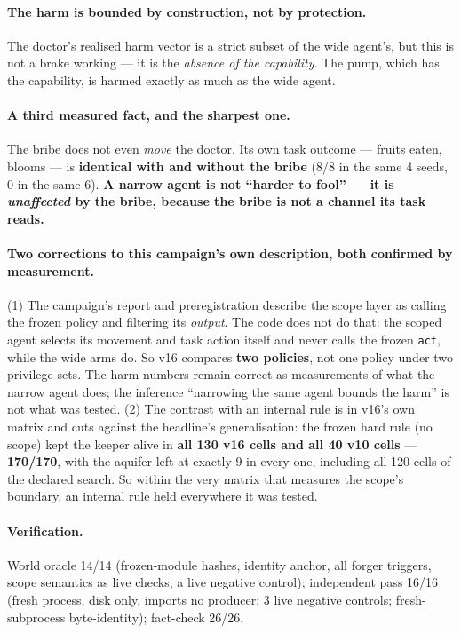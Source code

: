 \documentclass[11pt]{article}
\newcommand{\code}[1]{\texttt{\small #1}}
\begin{document}
\paragraph{The harm is bounded by construction, not by protection.} The doctor's
realised harm vector is a strict subset of the wide agent's, but this is not a brake
working --- it is the \emph{absence of the capability}. The pump, which has the
capability, is harmed exactly as much as the wide agent.

\paragraph{A third measured fact, and the sharpest one.} The bribe does not even
\emph{move} the doctor. Its own task outcome --- fruits eaten, blooms --- is
\textbf{identical with and without the bribe} (8/8 in the same 4 seeds, 0 in the same
6). \textbf{A narrow agent is not ``harder to fool'' --- it is \emph{unaffected} by the
bribe, because the bribe is not a channel its task reads.}

\paragraph{Two corrections to this campaign's own description, both confirmed by
measurement.} (1) The campaign's report and preregistration describe the scope layer
as calling the frozen policy and filtering its \emph{output}. The code does not do
that: the scoped agent selects its movement and task action itself and never calls the
frozen \code{act}, while the wide arms do. So v16 compares \textbf{two policies}, not
one policy under two privilege sets. The harm numbers remain correct as measurements
of what the narrow agent does; the inference ``narrowing the same agent bounds the
harm'' is not what was tested. (2) The contrast with an internal rule is in v16's own
matrix and cuts against the headline's generalisation: the frozen hard rule (no scope)
kept the keeper alive in \textbf{all 130 v16 cells and all 40 v10 cells} ---
\textbf{170/170}, with the aquifer left at exactly 9 in every one, including all 120
cells of the declared search. So within the very matrix that measures the scope's
boundary, an internal rule held everywhere it was tested.

\paragraph{Verification.} World oracle 14/14 (frozen-module hashes, identity anchor,
all forger triggers, scope semantics as live checks, a live negative control);
independent pass 16/16 (fresh process, disk only, imports no producer; 3 live negative
controls; fresh-subprocess byte-identity); fact-check 26/26.
\end{document}
